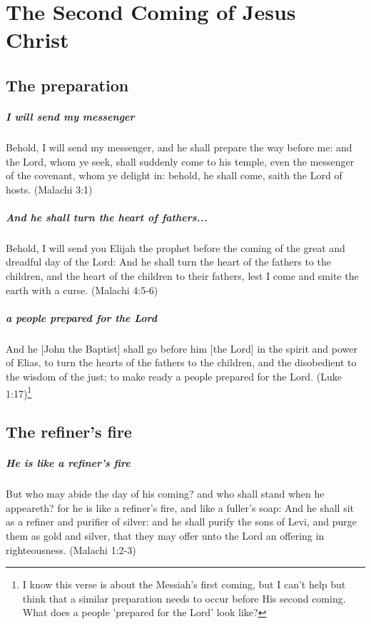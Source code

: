 \chapter{The Second Coming of Jesus Christ}

\section{The preparation}

\paragraph{I will send my messenger}
Behold, I will send my messenger, and he shall prepare the way before me: and the Lord, whom ye seek, shall suddenly come to his temple, even the messenger of the covenant, whom ye delight in: behold, he shall come, saith the Lord of hosts. (Malachi 3:1)

\paragraph{And he shall turn the heart of fathers...}
Behold, I will send you Elijah the prophet before the coming of the great and dreadful day of the Lord: And he shall turn the heart of the fathers to the children, and the heart of the children to their fathers, lest I come and smite the earth with a curse. (Malachi 4:5-6)

\paragraph{a people prepared for the Lord}
And he [John the Baptist] shall go before him [the Lord] in the spirit and power of Elias, to turn the hearts of the fathers to the children, and the disobedient to the wisdom of the just; to make ready a people prepared for the Lord. (Luke 1:17)\footnote{I know this verse is about the Messiah's first coming, but I can't help but think that a similar preparation needs to occur before His second coming. What does a people 'prepared for the Lord' look like?}

\section{The refiner's fire}

\paragraph{He is like a refiner's fire}
But who may abide the day of his coming? and who shall stand when he appeareth? for he is like a refiner's fire, and like a fuller's soap: And he shall sit as a refiner and purifier of silver: and he shall purify the sons of Levi, and purge them as gold and silver, that they may offer unto the Lord an offering in righteousness. (Malachi 1:2-3)

